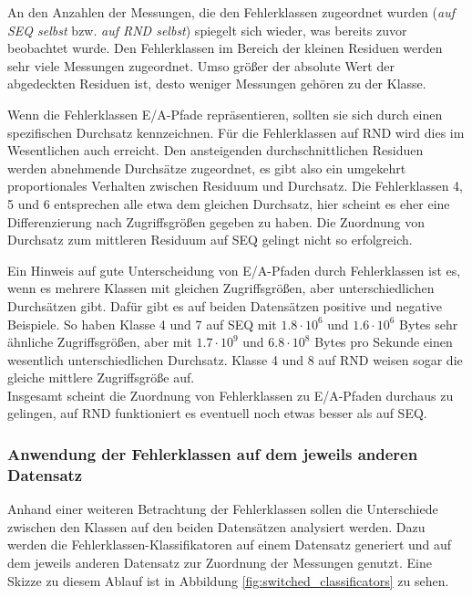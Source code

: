 \documentclass[
	12pt,
	a4paper,
	BCOR10mm,
	DIV14,
	listof=totoc,
	bibliography=totoc,
	headsepline
]{scrreprt}
\begin{document}
An den Anzahlen der Messungen, die den Fehlerklassen zugeordnet wurden (\textit{auf SEQ selbst} bzw. \textit{auf RND selbst}) spiegelt sich wieder, was bereits zuvor beobachtet wurde.
Den Fehlerklassen im Bereich der kleinen Residuen werden sehr viele Messungen zugeordnet. Umso größer der absolute Wert der abgedeckten Residuen ist, desto weniger Messungen gehören zu der Klasse.\medskip

Wenn die Fehlerklassen E/A-Pfade repräsentieren, sollten sie sich durch einen spezifischen Durchsatz kennzeichnen.
Für die Fehlerklassen auf RND wird dies im Wesentlichen auch erreicht.
Den ansteigenden durchschnittlichen Residuen werden abnehmende Durchsätze zugeordnet, es gibt also ein umgekehrt proportionales Verhalten zwischen Residuum und Durchsatz.
Die Fehlerklassen 4, 5 und 6 entsprechen alle etwa dem gleichen Durchsatz, hier scheint es eher eine Differenzierung nach Zugriffsgrößen gegeben zu haben.
Die Zuordnung von Durchsatz zum mittleren Residuum auf SEQ gelingt nicht so erfolgreich.\medskip

Ein Hinweis auf gute Unterscheidung von E/A-Pfaden durch Fehlerklassen ist es, wenn es mehrere Klassen mit gleichen Zugriffsgrößen, aber unterschiedlichen Durchsätzen gibt.
Dafür gibt es auf beiden Datensätzen positive und negative Beispiele.
So haben Klasse 4 und 7 auf SEQ mit $1.8\cdot 10^6$ und $1.6\cdot 10^6$ Bytes sehr ähnliche Zugriffsgrößen, aber mit $1.7\cdot 10^9$ und $6.8\cdot 10^8$ Bytes pro Sekunde einen wesentlich unterschiedlichen Durchsatz.
Klasse 4 und 8 auf RND weisen sogar die gleiche mittlere Zugriffsgröße auf.\\
Insgesamt scheint die Zuordnung von Fehlerklassen zu E/A-Pfaden durchaus zu gelingen, auf RND funktioniert es eventuell noch etwas besser als auf SEQ.

\subsubsection{Anwendung der Fehlerklassen auf dem jeweils anderen Datensatz}
Anhand einer weiteren Betrachtung der Fehlerklassen sollen die Unterschiede zwischen den Klassen auf den beiden Datensätzen analysiert werden.
Dazu werden die Fehlerklassen-Klassifikatoren auf einem Datensatz generiert und auf dem jeweils anderen Datensatz zur Zuordnung der Messungen genutzt.
Eine Skizze zu diesem Ablauf ist in Abbildung \ref{fig:switched_classificators} zu sehen.
\end{document}
